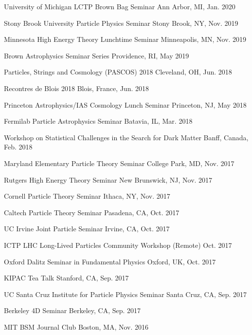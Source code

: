 \documentclass[letterpaper,11pt]{article}
\newenvironment{packed_itemize}{
\begin{itemize}[label=\raisebox{0.25ex}{\tiny$\bullet$}]
  \setlength{\itemsep}{4.2pt}
  \setlength{\parskip}{0pt}
  \setlength{\parsep}{0pt}}{\end{itemize}
}
\begin{document}
\begin{packed_itemize}
  \item University of Michigan LCTP Brown Bag Seminar \hfill Ann Arbor, MI, Jan. 2020
  \item Stony Brook University Particle Physics Seminar \hfill Stony Brook, NY, Nov. 2019
  \item Minnesota High Energy Theory Lunchtime Seminar \hfill  Minneapolis, MN, Nov. 2019
  \item Brown Astrophysics Seminar Series \hfill Providence, RI, May 2019
  \item Particles, Strings and Cosmology (PASCOS) 2018 \hfill Cleveland, OH, Jun. 2018
  \item Recontres de Blois 2018 \hfill Blois, France, Jun. 2018
  \item Princeton Astrophysics/IAS Cosmology Lunch Seminar \hfill Princeton, NJ, May 2018
  \item Fermilab Particle Astrophysics Seminar \hfill Batavia, IL, Mar. 2018
  \item Workshop on Statistical Challenges in the Search for Dark Matter \hfill Banff, Canada, Feb. 2018
  \item Maryland Elementary Particle Theory Seminar \hfill College Park, MD, Nov. 2017
  \item Rutgers High Energy Theory Seminar \hfill New Brunswick, NJ, Nov. 2017
  \item Cornell Particle Theory Seminar \hfill Ithaca, NY, Nov. 2017
  \item Caltech Particle Theory Seminar \hfill Pasadena, CA, Oct. 2017
  \item UC Irvine Joint Particle Seminar \hfill Irvine, CA, Oct. 2017
  \item ICTP LHC Long-Lived Particles Community Workshop (Remote) \hfill Oct. 2017
  \item Oxford Dalitz Seminar in Fundamental Physics  \hfill Oxford, UK, Oct. 2017
  \item KIPAC Tea Talk  \hfill Stanford, CA, Sep. 2017
  \item UC Santa Cruz Institute for Particle Physics Seminar  \hfill Santa Cruz, CA, Sep. 2017
  \item Berkeley 4D Seminar  \hfill Berkeley, CA, Sep. 2017
  \item MIT BSM Journal Club \hfill Boston, MA, Nov. 2016
\end{packed_itemize}
\end{document}
